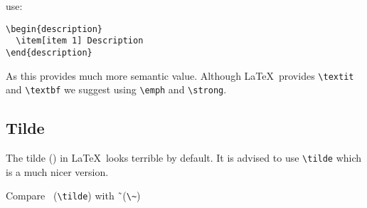 \documentclass[11pt,a4paper]{article}
\begin{document}
use:

\begin{verbatim}
\begin{description}
  \item[item 1] Description
\end{description}
\end{verbatim}

As this provides much more semantic value. Although \LaTeX\ provides
\verb|\textit| and \verb|\textbf| we suggest using \verb|\emph| and
\verb|\strong|.

\subsection{Tilde}
\label{sec:tilde}

The tilde (\tilde) in \LaTeX\ looks terrible by default. It is advised to use
\verb|\tilde| which is a much nicer version.

Compare \tilde\ (\verb|\tilde|) with \~\ (\verb|\~|)
\end{document}
